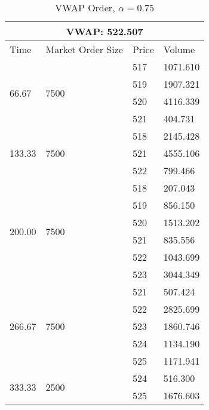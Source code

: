 \begin{table}[htbp]
\begin{center}
\caption{VWAP Order, $\alpha = 0.75$} \label{tab:vwap_order}
\begin{tabular}{l|l|l|l}
\hline \hline
\multicolumn{4}{c}{VWAP: 522.507}                                      \\
\hline
Time                    & Market Order Size        & Price & Volume   \\
\hline
\multirow{4}{*}{66.67}  & \multirow{4}{*}{7500} & 517 & 1071.610 \\
                        &                       & 519 & 1907.321 \\
                        &                       & 520 & 4116.339 \\
                        &                       & 521 & 404.731  \\
\hline
\multirow{3}{*}{133.33} & \multirow{3}{*}{7500} & 518 & 2145.428 \\
                        &                       & 521 & 4555.106 \\
                        &                       & 522 & 799.466  \\
\hline
\multirow{6}{*}{200.00} & \multirow{6}{*}{7500} & 518 & 207.043  \\
                        &                       & 519 & 856.150  \\
                        &                       & 520 & 1513.202 \\
                        &                       & 521 & 835.556  \\
                        &                       & 522 & 1043.699 \\
                        &                       & 523 & 3044.349 \\
\hline
\multirow{5}{*}{266.67} & \multirow{5}{*}{7500} & 521 & 507.424  \\
                        &                       & 522 & 2825.699 \\
                        &                       & 523 & 1860.746 \\
                        &                       & 524 & 1134.190 \\
                        &                       & 525 & 1171.941 \\
\hline
\multirow{3}{*}{333.33} & \multirow{3}{*}{2500} & 524 & 516.300  \\
                        &                       & 525 & 1676.603 \\

\end{tabular}
\end{center}
\end{table}
